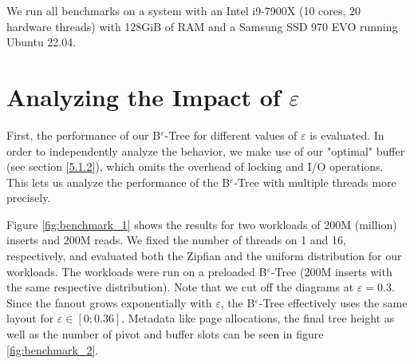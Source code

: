 We run all benchmarks on a system with an Intel i9-7900X (10 cores, 20 hardware threads) with 128GiB of RAM and a Samsung SSD 970 EVO running Ubuntu 22.04.

\section{Analyzing the Impact of $\varepsilon$}

First, the performance of our B$^\varepsilon$-Tree for different values of $\varepsilon$ is evaluated. In order to independently analyze the behavior, we make use of our "optimal" buffer (see section \ref{5.1.2}), which omits the overhead of locking and I/O operations. This lets us analyze the performance of the B$^\varepsilon$-Tree with multiple threads more precisely. 

Figure \ref{fig:benchmark_1} shows the results for two workloads of 200M (million) inserts and 200M reads. We fixed the number of threads on 1 and 16, respectively, and evaluated both the Zipfian and the uniform distribution for our workloads. The workloads were run on a preloaded B$^\varepsilon$-Tree (200M inserts with the same respective distribution). Note that we cut off the diagrams at $\varepsilon=0.3$. Since the fanout grows exponentially with $\varepsilon$, the B$^\varepsilon$-Tree effectively uses the same layout for $\varepsilon \in [0; 0.36]$.\newline
Metadata like page allocations, the final tree height as well as the number of pivot and buffer slots can be seen in figure \ref{fig:benchmark_2}. 

